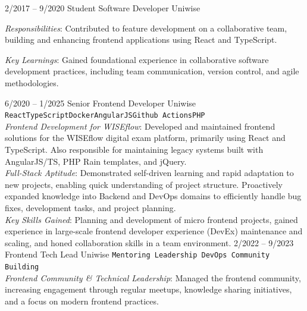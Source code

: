 \documentclass[9pt]{developercv} %
\begin{document}


\begin{entrylist}
	\entry
		{2/2017 -- 9/2020}
		{Student Software Developer}
		{Uniwise}
		{

			\textit{Responsibilities}: Contributed to feature development on a collaborative team, building and enhancing frontend applications using React and TypeScript.

			\textit{Key Learnings}: Gained foundational experience in collaborative software development practices, including team communication, version control, and agile methodologies.
		}
	\entry
		{6/2020 -- 1/2025}
		{Senior Frontend Developer}
		{Uniwise}
		{
			\texttt{React}\slashsep\texttt{TypeScript}\slashsep\texttt{Docker}\slashsep\texttt{AngularJS}\slashsep\texttt{Github Actions}\slashsep\texttt{PHP}\\

			\textit{Frontend Development for WISEflow}: Developed and maintained frontend solutions for the WISEflow digital exam platform, primarily using React and TypeScript. Also responsible for maintaining legacy systems built with AngularJS/TS, PHP Rain templates, and jQuery.\\

			\textit{Full-Stack Aptitude}: Demonstrated self-driven learning and rapid adaptation to new projects, enabling quick understanding of project structure. Proactively expanded knowledge into Backend and DevOps domains to efficiently handle bug fixes, development tasks, and project planning.\\

			\textit{Key Skills Gained}: Planning and development of micro frontend projects, gained experience in large-scale frontend developer experience (DevEx) maintenance and scaling, and honed collaboration skills in a team environment.
		}
	\entry
		{2/2022 -- 9/2023}
		{Frontend Tech Lead}
		{Uniwise}
		{
			\texttt{Mentoring \slashsep Leadership \slashsep DevOps \slashsep Community Building}\\

			\textit{Frontend Community \& Technical Leadership}: Managed the frontend community, increasing engagement through regular meetups, knowledge sharing initiatives, and a focus on modern frontend practices.\\

}
\end{entrylist}
\end{document}
